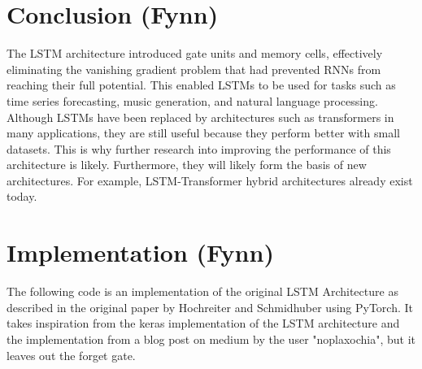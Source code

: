 \documentclass[twoside,a4paper,10pt,DIV=12,BCOR=12mm]{scrartcl}
\begin{document}
\section{Conclusion (Fynn)}
The LSTM architecture introduced gate units and memory cells, effectively eliminating the vanishing gradient problem that had prevented RNNs from reaching their full potential.\cite{hochreiter1997lstm} 
This enabled LSTMs to be used for tasks such as time series forecasting, music generation, and natural language processing.\cite{eck2002musicgeneration,nielsen2024electricitypriceforcasting,gers2001timeseries,torres2022elctricityforecasting,sak2014longshorttermmemorybased}\\
Although LSTMs have been replaced by architectures such as transformers in many applications, they are still useful because they perform better with small datasets. This is why further research into improving the performance of this architecture is likely.\cite{alselwi2024lstmfuture} Furthermore, they will likely form the basis of new architectures. For example, LSTM-Transformer hybrid architectures already exist today. \cite{zhao2025lstmtransformerhybrid} 

\appendix

\section{Implementation (Fynn)}

The following code is an implementation of the original LSTM Architecture as described in the original paper by Hochreiter and Schmidhuber using PyTorch. It takes inspiration from the keras implementation of the LSTM architecture and the implementation from a blog post on medium by the user "noplaxochia", but it leaves out the forget gate.
\end{document}
